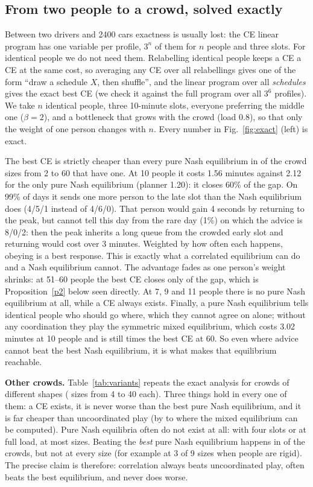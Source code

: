 \documentclass{article}
\begin{document}
\subsection{From two people to a crowd, solved exactly}\label{sec:exact}
Between two drivers and 2400 cars exactness is usually lost: the CE linear program has one variable per profile, $3^n$
of them for $n$ people and three slots. For identical people we do not need them. Relabelling identical people keeps a
CE a CE at the same cost, so averaging any CE over all relabellings gives one of the form ``draw a schedule $X$, then
shuffle'', and the linear program over all \emph{schedules} gives the exact best CE (we check it against the full
program over all $3^6$ profiles). We take $n$ identical people, three 10-minute slots, everyone preferring the middle
one ($\beta=2$), and a bottleneck that grows with the crowd (load 0.8), so that only the weight of one person changes
with $n$. Every number in Fig.~\ref{fig:exact} (left) is exact.

The best CE is strictly cheaper than every pure Nash equilibrium in \EightBetter{} of the \EightWith{} crowd sizes from 2 to 60 that
have one. At 10 people it costs 1.56 minutes against 2.12 for the only pure Nash equilibrium (planner 1.20): it closes
60\% of the gap. On 99\% of days it sends one more person to the late slot than the Nash equilibrium does (4/5/1
instead of 4/6/0). That person would gain 4 seconds by returning to the peak, but cannot tell this day from the rare
day (1\%) on which the advice is 8/0/2: then the peak inherits a long queue from the crowded early slot and returning
would cost over 3 minutes. Weighted by how often each happens, obeying is a best response. This is exactly what a correlated equilibrium can do and a Nash equilibrium cannot. The advantage fades
as one person's weight shrinks: at 51--60 people the best CE closes only \EightFade{} of the gap, which is
Proposition~\ref{p2} below seen directly. At 7, 9 and 11 people there is no pure Nash equilibrium at all, while a CE
always exists. Finally, a pure Nash equilibrium tells identical people who should go where, which they cannot agree on
alone; without any coordination they play the symmetric mixed equilibrium, which costs 3.02 minutes at 10 people and is
still \EightMixed{} times the best CE at 60. So even where advice cannot beat the best Nash equilibrium, it is what makes that
equilibrium reachable.

\textbf{Other crowds.} Table~\ref{tab:variants} repeats the exact analysis for \VarCount{} crowds of different shapes
(\VarSizes{} sizes from 4 to 40 each). Three things hold in every one of them: a CE exists, it is never worse than
the best pure Nash equilibrium, and it is far cheaper than uncoordinated play (by \VarMixedMin{} to \VarMixedMax{}
where the mixed equilibrium can be computed). Pure Nash equilibria often do not exist at all: with four slots or at full
load, at most sizes. Beating the \emph{best} pure Nash equilibrium happens in \VarBeat{} of the \VarCount{} crowds, but
not at every size (for example at 3 of 9 sizes when people are rigid). The precise claim is therefore: correlation
always beats uncoordinated play, often beats the best equilibrium, and never does worse.
\end{document}
